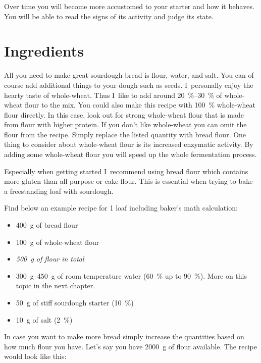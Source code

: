 Over time you will become more accustomed to your starter
and how it behaves. You will be able to read the signs of its
activity and judge its state.

\section{Ingredients}

All you need to make great sourdough bread is flour, water, and salt. You
can of course add additional things to your dough such as seeds. I~personally
enjoy the hearty taste of whole-wheat. Thus I~like to add around
\qtyrange{20}{30}{\percent} of whole-wheat flour to the mix. You could also
make this recipe with \qty{100}{\percent}
whole-wheat flour directly. In this case, look out for strong whole-wheat
flour that is made from flour with higher protein. If you don't like whole-wheat
you can omit the flour from the recipe. Simply replace the listed
quantity with bread flour. One thing to consider about whole-wheat
flour is its increased enzymatic activity. By adding some whole-wheat
flour you will speed up the whole fermentation process.

Especially when getting started I~recommend using bread flour which
contains more gluten than all-purpose or cake flour. This is essential
when trying to bake a freestanding loaf with sourdough.

Find below an example recipe for 1 loaf including baker's math calculation:

\begin{itemize}
  \item \qty{400}{\gram} of bread flour
  \item \qty{100}{\gram} of whole-wheat flour
  \item \emph{500~g of flour in total}
  \item \qtyrange{300}{450}{\gram} of room temperature water (\qty{60}{\percent} up to \qty{90}{\percent}). More on
this topic in the next chapter.
  \item \qty{50}{\gram} of stiff sourdough starter (\qty{10}{\percent})
  \item \qty{10}{\gram} of salt (\qty{2}{\percent})
\end{itemize}

In case you want to make more bread simply increase the quantities based on
how much flour you have. Let's say you have \qty{2000}{\gram} of flour available. The
recipe would look like this:

